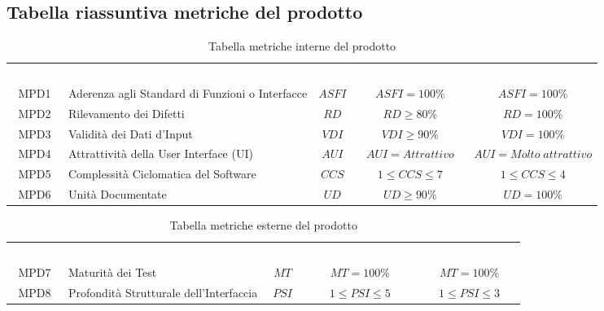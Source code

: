 \subsection{Tabella riassuntiva metriche del prodotto}

\renewcommand{\arraystretch}{1.5}
\begin{longtable}{ c C{4cm} c c c}
\caption{Tabella metriche interne del prodotto}\\
\textcolor{white}{\textbf{Metrica}} & \textcolor{white}{\textbf{Nome}} & \textcolor{white}{\textbf{Sigla}} & \textcolor{white}{\textbf{Range Accettabile}} & \textcolor{white}{\textbf{Range Ottimale}}\\
    MPD1 & Aderenza agli Standard di Funzioni o Interfacce & $ASFI$ & $ASFI = 100\%$ & $ASFI = 100\%$\\
    MPD2 & Rilevamento dei Difetti & $RD$ & $ RD \geq 80\% $ & $RD = 100\%$\\
    MPD3 & Validità dei Dati d'Input & $VDI$ &  $VDI \geq 90\%$ &  $VDI = 100\%$\\
    MPD4 & Attrattività della User Interface (UI) & $AUI$ & $AUI = Attrattivo$ &  $AUI = Molto \; attrattivo$\\
    MPD5 & Complessità Ciclomatica del Software & $CCS $ & $1 \leq CCS \leq 7 $ & $1 \leq CCS \leq 4$\\
    MPD6 & Unità Documentate & $UD$ & $UD \geq 90\%$ & $UD = 100\%$\\
\end{longtable} 

\newpage %

\renewcommand{\arraystretch}{1.5}
\begin{longtable}{ c C{4cm} c c c}
\caption{Tabella metriche esterne del prodotto}\\
\textcolor{white}{\textbf{Metrica}} & \textcolor{white}{\textbf{Nome}} & \textcolor{white}{\textbf{Sigla}} & \textcolor{white}{\textbf{Range Accettabile}} & \textcolor{white}{\textbf{Range Ottimale}}\\
    MPD7 & Maturità dei Test & $MT$ & $MT = 100\%$ & $MT = 100\%$\\
    MPD8 & Profondità Strutturale dell'Interfaccia & $PSI$ & $1 \leq PSI \leq 5$ &$1 \leq PSI \leq 3$\\
\end{longtable}
